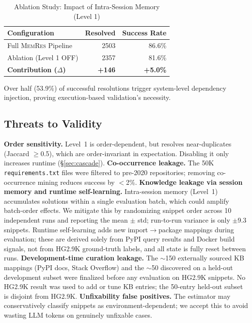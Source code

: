 \documentclass[sigconf,screen]{acmart}
\begin{document}
\begin{table}[h]
\caption{Ablation Study: Impact of Intra-Session Memory (Level 1)}
\label{tab:ablation}
\centering
\begin{tabular}{lrr}
\toprule
\textbf{Configuration} & \textbf{Resolved} & \textbf{Success Rate} \\
\midrule
Full \textsc{MemRes} Pipeline & \num{2503} & 86.6\% \\
Ablation (Level 1 OFF) & \num{2357} & 81.6\% \\
\midrule
\textbf{Contribution ($\Delta$)} & \textbf{+\num{146}} & \textbf{+5.0\%} \\
\bottomrule
\end{tabular}
\end{table}

Over half (53.9\%) of successful resolutions trigger system-level dependency injection, proving execution-based validation's necessity.

\subsection{Threats to Validity}
\textbf{Order sensitivity.}
Level~1 is order-dependent, but resolves near-duplicates (Jaccard $\geq$0.5), which are order-invariant in expectation. Disabling it only increases runtime (\S\ref{sec:cascade}).
\textbf{Co-occurrence leakage.}
The 50K \texttt{requirements.txt} files were filtered to pre-2020 repositories; removing co-occurrence mining reduces success by $<$2\%.
\textbf{Knowledge leakage via session memory and runtime self-learning.}
Intra-session memory (Level~1) accumulates solutions within a single evaluation batch, which could amplify batch-order effects.
We mitigate this by randomizing snippet order across 10 independent runs and reporting the mean $\pm$ std; run-to-run variance is only $\pm$9.3 snippets.
Runtime self-learning adds new import$\to$package mappings during evaluation; these are derived solely from PyPI query results and Docker build signals, not from HG2.9K ground-truth labels, and all state is fully reset between runs.
\textbf{Development-time curation leakage.}
The $\sim$150 externally sourced KB mappings (PyPI docs, Stack Overflow) and the $\sim$50 discovered on a held-out development subset were finalized before any evaluation on HG2.9K snippets.
No HG2.9K result was used to add or tune KB entries; the 50-entry held-out subset is disjoint from HG2.9K.
\textbf{Unfixability false positives.}
The estimator may conservatively classify snippets as environment-dependent; we accept this to avoid wasting LLM tokens on genuinely unfixable cases.
 
\end{document}
